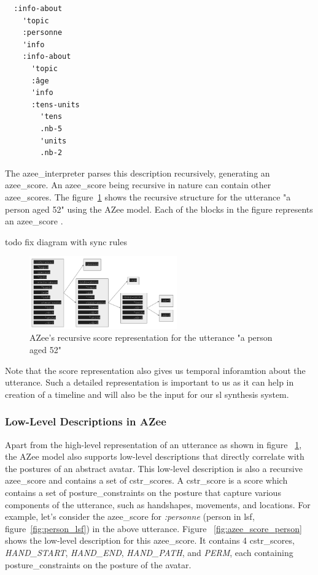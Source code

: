 \documentclass[../../main.tex]{subfiles}
\begin{document}
\begin{verbatim}
  :info-about
    'topic
    :personne
    'info
    :info-about
      'topic
      :âge
      'info
      :tens-units
        'tens
        .nb-5
        'units
        .nb-2
\end{verbatim}

The \gls{azee_interpreter} parses this description recursively, generating an \gls{azee_score}. An \gls{azee_score} being recursive in nature can contain other \gls{azee_score}s. The figure~\ref{fig:azee_score_example} shows the recursive structure for the \gls{utterance} "a person aged 52" using the AZee model. Each of the blocks in the figure represents an \gls{azee_score} .

todo fix diagram with sync rules
\begin{figure}[h]
  \centering \includegraphics[width = 2.5in]{chapters/background_work/images/azee_score_example.png}
  \caption{AZee's recursive score representation for the \gls{utterance} "a person aged 52"}
  \label{fig:azee_score_example}
\end{figure}

Note that the \gls{score} representation also gives us temporal inforamtion about the \gls{utterance}. Such a detailed representation is important to us as it can help in creation of a timeline and will also be the input for our \gls{sl} synthesis system. 

\subsubsection{Low-Level Descriptions in AZee}
\label{ch:background_work:sign_language_descriptions:azee:low_level}

Apart from the high-level representation of an \gls{utterance} as shown in figure ~\ref{fig:azee_score_example}, the AZee model also supports low-level descriptions that directly correlate with the postures of an abstract avatar. This low-level description is also a recursive \gls{azee_score} and contains a set of \gls{cstr_score}s. A \gls{cstr_score} is a score which contains a set of \gls{posture_constraint}s on the posture that capture various components of the utterance, such as handshapes, movements, and locations. For example, let's consider the \gls{azee_score} for \emph{:personne} (person in \gls{lsf}, figure~\ref{fig:person_lsf}) in the above utterance. Figure ~\ref{fig:azee_score_person} shows the low-level description for this \gls{azee_score}. It contains 4 \gls{cstr_score}s, \emph{HAND\_START}, \emph{HAND\_END}, \emph{HAND\_PATH}, and \emph{PERM}, each containing \gls{posture_constraint}s on the posture of the avatar.
\end{document}
